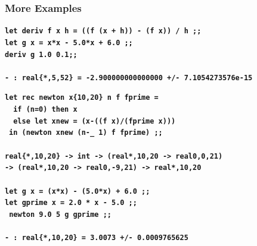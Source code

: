 \documentclass[handout,t]{beamer}
\def\mytt#1{\texttt{\textbf{#1}}}
\def\real#1{real\{#1\}}
\begin{document}
\begin{frame}
  \frametitle{More Examples}


\scriptsize
\color{blue}
 \mytt{let deriv f x h = ((f (x + h)) - (f x)) / h ;;} \\
\mytt{let g x = x*x - 5.0*x + 6.0 ;;}\\
\mytt{deriv g 1.0 0.1;;}\\
~\\\color{red}
\mytt{- : \real{*,5,52} = -2.900000000000000 +/- 7.1054273576e-15}\\

\vspace{0.5cm}

\color{blue}
\mytt{let rec newton x\{10,20\} n f fprime =}\\
~\hspace{.5cm}\mytt{  if (n=0) then x}\\ 
~\hspace{.5cm}\mytt{  else let xnew = (x-((f x)/(fprime x)))}\\
~\hspace{1.55cm}\mytt{in (newton xnew (n-\_ 1) f fprime) ;;}\\
~\\ \color{red}
\mytt{\real{*,10,20} -> int -> (real{*,10,20} -> real{0,0,21})} \\
\mytt{-> (real{*,10,20} -> real{0,-9,21}) -> real{*,10,20}}\\
~\\
\color{blue}
\mytt{let g x = (x*x) - (5.0*x) + 6.0 ;;}\\
\mytt{let gprime x = 2.0 * x - 5.0 ;;}\\
\mytt{ newton 9.0 5 g gprime ;;}\\
~\\\color{red}
\mytt{- : real\{*,10,20\} = 3.0073 +/- 0.0009765625}\\


\end{frame}
\end{document}
